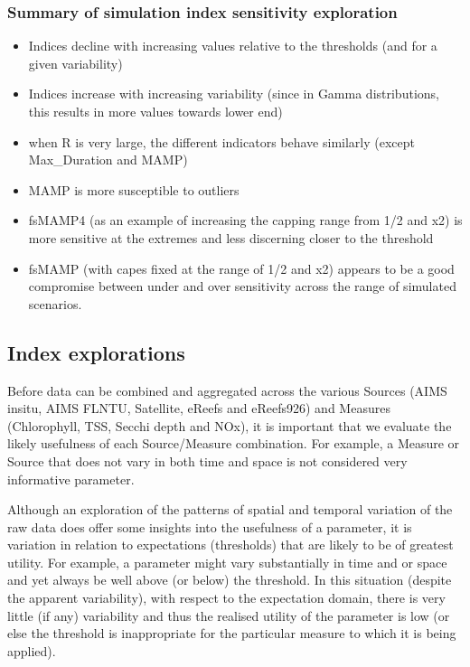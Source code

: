 \clearpage

\subsubsection{Summary of simulation index sensitivity exploration}
\begin{itemize}
\item Indices decline with increasing values relative to the thresholds (and for a given
variability)
\item Indices increase with increasing variability (since in Gamma distributions, this results in
more values towards lower end)
\item when R is very large, the different indicators behave similarly (except Max\_Duration and
MAMP)
\item MAMP is more susceptible to outliers
\item fsMAMP4 (as an example of increasing the capping range from 1/2 and x2) is more sensitive at the extremes and less discerning closer to the threshold
\item fsMAMP (with capes fixed at the range of 1/2 and x2) appears to be a good compromise between under and over sensitivity across the range of simulated
  scenarios.
\end{itemize}


\subsection{Index explorations}

Before data can be combined and aggregated across the various Sources (AIMS insitu, AIMS FLNTU,
Satellite, eReefs and eReefs926) and Measures (Chlorophyll, TSS, Secchi depth and NOx), it is
important that we evaluate the likely usefulness of each Source/Measure combination.  For example, a
Measure or Source that does not vary in both time and space is not considered very informative
parameter.

Although an exploration of the patterns of spatial and temporal variation of the raw data does offer
some insights into the usefulness of a parameter, it is variation in relation to expectations
(thresholds) that are likely to be of greatest utility.  For example, a parameter might vary
substantially in time and or space and yet always be well above (or below) the threshold.  In this
situation (despite the apparent variability), with respect to the expectation domain, there is very little
(if any) variability and thus the realised utility of the parameter is low (or else the threshold is
inappropriate for the particular measure to which it is being applied).

